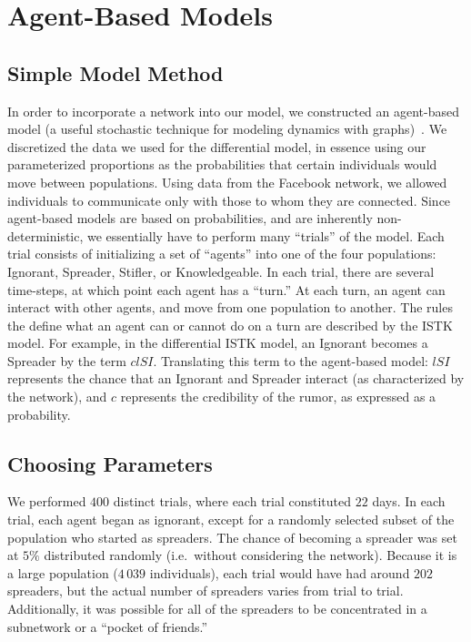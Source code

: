 \section{Agent-Based Models}
\label{sec:abmodel}

\subsection{Simple Model Method}
\label{subsec:abmodelsetup}

\noindent In order to incorporate a network into our model, we constructed an agent-based model (a useful stochastic technique for modeling dynamics with graphs)~\cite{snijders-2010}.
We discretized the data we used for the differential model, in essence using our parameterized proportions as the probabilities that certain individuals would move between populations.
Using data from the Facebook network, we allowed individuals to communicate only with those to whom they are connected.
Since agent-based models are based on probabilities, and are inherently non-deterministic, we essentially have to perform many ``trials'' of the model.
Each trial consists of initializing a set of ``agents'' into one of the four populations: Ignorant, Spreader, Stifler, or Knowledgeable.
In each trial, there are several time-steps, at which point each agent has a ``turn.''
At each turn, an agent can interact with other agents, and move from one population to another.
The rules the define what an agent can or cannot do on a turn are described by the ISTK model.
For example, in the differential ISTK model, an Ignorant becomes a Spreader by the term $ clSI $.
Translating this term to the agent-based model: $ lSI $ represents the chance that an Ignorant and Spreader interact (as characterized by the network), and $ c $ represents the credibility of the rumor, as expressed as a probability.

\subsection{Choosing Parameters}
We performed $ 400 $ distinct trials, where each trial constituted $ 22 $ days.
In each trial, each agent began as ignorant, except for a randomly selected subset of the population who started as spreaders.
The chance of becoming a spreader was set at $ 5\% $ distributed randomly (i.e.\ without considering the network).
Because it is a large population ($ 4\,039 $ individuals), each trial would have had around $ 202 $ spreaders, but the actual number of spreaders varies from trial to trial.
Additionally, it was possible for all of the spreaders to be concentrated in a subnetwork or a ``pocket of friends.''

